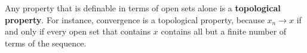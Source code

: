 Any property that is definable in terms of open sets alone is a \textbf{topological property}. For instance, convergence is a topological property, because $x_n \to x$ if and only if every open set that contains $x$ contains all but a finite number of terms of the sequence.
